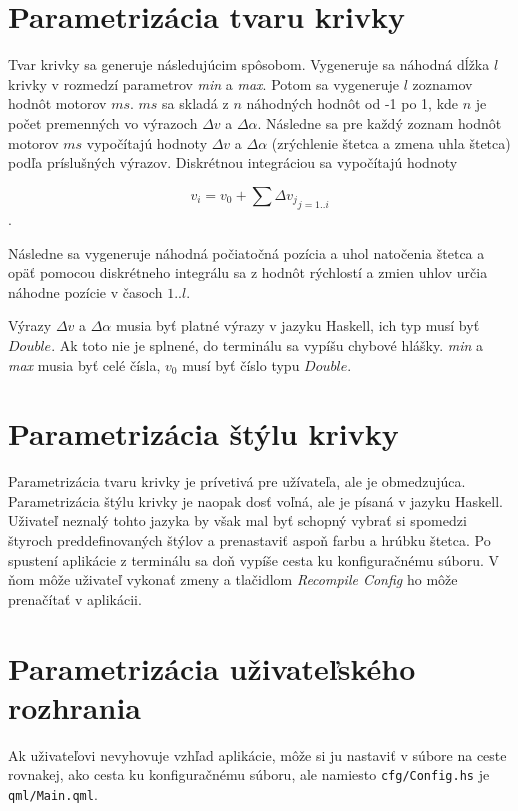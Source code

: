 \documentclass[11pt,a4paper]{article}
\begin{document}
\FloatBarrier

\section{Parametrizácia tvaru krivky}

Tvar krivky sa generuje následujúcim spôsobom. Vygeneruje sa náhodná dĺžka $l$
krivky v rozmedzí parametrov \emph{min} a \emph{max}. Potom sa vygeneruje $l$
zoznamov hodnôt motorov $ms$. $ms$ sa skladá z $n$ náhodných hodnôt od -1 po 1,
kde $n$ je počet premenných vo výrazoch $\Delta v$ a $\Delta \alpha$. Následne
sa pre každý zoznam hodnôt motorov $ms$ vypočítajú hodnoty $\Delta v$ a $\Delta
\alpha$ (zrýchlenie štetca a zmena uhla štetca) podľa príslušných výrazov.
Diskrétnou integráciou sa vypočítajú hodnoty

\begin{equation}
  v_i = v_0 + \sum{\Delta v_j}_{j = 1 .. i}
\end{equation}.

Následne sa vygeneruje náhodná počiatočná pozícia a uhol natočenia štetca a opäť
pomocou diskrétneho integrálu sa z hodnôt rýchlostí a zmien uhlov určia náhodne
pozície v časoch $1 .. l$.

Výrazy $\Delta v$ a $\Delta \alpha$ musia byť platné výrazy v jazyku Haskell,
ich typ musí byť $Double$. Ak toto nie je splnené, do terminálu sa vypíšu
chybové hlášky. \emph{min} a \emph{max} musia byť celé čísla, $v_0$ musí byť
číslo typu $Double$.

\section{Parametrizácia štýlu krivky}

Parametrizácia tvaru krivky je prívetivá pre užívateľa, ale je obmedzujúca.
Parametrizácia štýlu krivky je naopak dosť voľná, ale je písaná v jazyku
Haskell. Uživateľ neznalý tohto jazyka by však mal byť schopný vybrať si
spomedzi štyroch preddefinovaných štýlov a prenastaviť aspoň farbu a hrúbku
štetca. Po spustení aplikácie z terminálu sa doň vypíše cesta ku konfiguračnému
súboru. V ňom môže uživateľ vykonať zmeny a tlačidlom \emph{Recompile Config} ho
môže prenačítať v aplikácii.

\section{Parametrizácia uživateľského rozhrania}

Ak uživateľovi nevyhovuje vzhľad aplikácie, môže si ju nastaviť v súbore na
ceste rovnakej, ako cesta ku konfiguračnému súboru, ale namiesto
\texttt{cfg/Config.hs} je \texttt{qml/Main.qml}.
\end{document}
